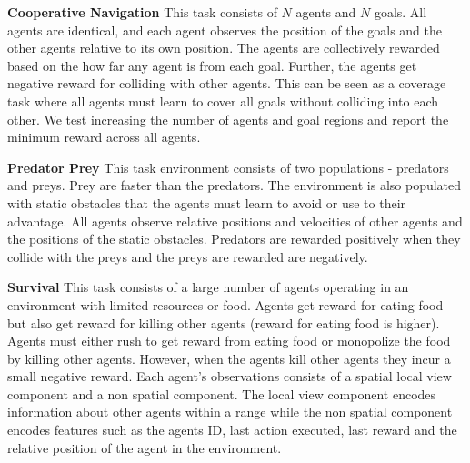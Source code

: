 \documentclass{article}
\begin{document}
\textbf{Cooperative Navigation} This task consists of $N$ agents and $N$ goals. All agents are identical, and each agent observes the position of the goals and the other agents relative to its own position. The agents are collectively rewarded based on the how far any agent is from each goal. Further, the agents get negative reward for colliding with other agents. This can be seen as a coverage task where all agents must learn to cover all goals without colliding into each other. We test increasing the number of agents and goal regions and report the minimum reward across all agents.
 
\textbf{Predator Prey} This task environment consists of two populations - predators and preys. Prey are faster than the predators. The environment is also populated with static obstacles that the agents must learn to avoid or use to their advantage. All agents observe relative positions and velocities of other agents and the positions of the static obstacles. Predators are rewarded positively when they collide with the preys and the preys are rewarded are negatively. %

\textbf{Survival} This task consists of a large number of agents operating in an environment with limited resources or food. Agents get reward for eating food but also get reward for killing other agents (reward for eating food is higher). Agents must either rush to get reward from eating food or monopolize the food by killing other agents. However, when the agents kill other agents they incur a small negative reward. Each agent's observations consists of a spatial local view component and a non spatial component. The local view component encodes information about other agents within a range while the non spatial component encodes features such as the agents ID, last action executed, last reward and the relative position of the agent in the environment. 
\end{document}
